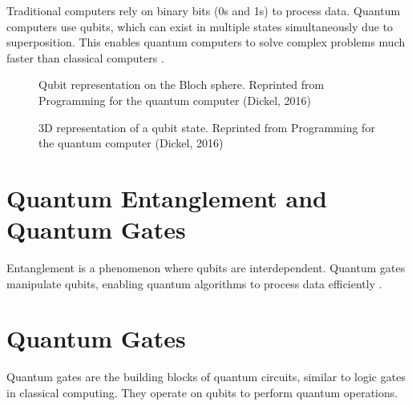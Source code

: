 \documentclass[a4paper,12pt]{article}
\begin{document}
Traditional computers rely on binary bits (0s and 1s) to process data. Quantum computers use qubits, which can exist in multiple states simultaneously due to superposition. This enables quantum computers to solve complex problems much faster than classical computers \cite{Gruska}.

\begin{figure}[ht]
    \centering
    \caption{Qubit representation on the Bloch sphere. Reprinted from Programming for the quantum computer (Dickel, 2016)}
    \label{fig:qubit}
\end{figure}

\begin{figure}[ht]
    \centering
    \caption{3D representation of a qubit state. Reprinted from Programming for the quantum computer (Dickel, 2016)}
    \label{fig:qubit3d}
\end{figure}

\section{Quantum Entanglement and Quantum Gates}
Entanglement is a phenomenon where qubits are interdependent. Quantum gates manipulate qubits, enabling quantum algorithms to process data efficiently \cite{Gruska}.

\section{Quantum Gates}
Quantum gates are the building blocks of quantum circuits, similar to logic gates in classical computing. They operate on qubits to perform quantum operations.
\end{document}
